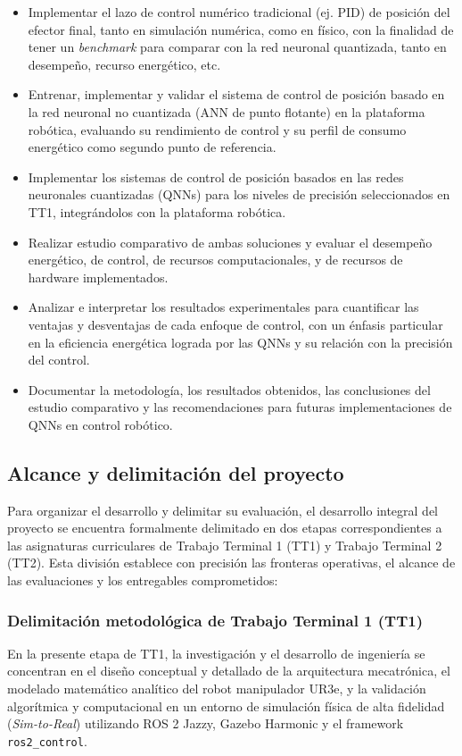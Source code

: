 \documentclass[12pt]{article}
\begin{document}
\begin{itemize}
    \item Implementar el lazo de control numérico tradicional (ej. PID) de posición del efector final, tanto en simulación numérica, como en físico, con la finalidad de tener un \textit{benchmark} para comparar con la red neuronal quantizada, tanto en desempeño, recurso energético, etc.
    \item Entrenar, implementar y validar el sistema de control de posición basado en la red neuronal no cuantizada (ANN de punto flotante) en la plataforma robótica, evaluando su rendimiento de control y su perfil de consumo energético como segundo punto de referencia.
    \item Implementar los sistemas de control de posición basados en las redes neuronales cuantizadas (QNNs) para los niveles de precisión seleccionados en TT1, integrándolos con la plataforma robótica.
    \item Realizar estudio comparativo de ambas soluciones y evaluar el desempeño energético, de control, de recursos computacionales, y de recursos de hardware implementados.
    \item Analizar e interpretar los resultados experimentales para cuantificar las ventajas y desventajas de cada enfoque de control, con un énfasis particular en la eficiencia energética lograda por las QNNs y su relación con la precisión del control.
    \item Documentar la metodología, los resultados obtenidos, las conclusiones del estudio comparativo y las recomendaciones para futuras implementaciones de QNNs en control robótico. 
\end{itemize}

\subsection*{Alcance y delimitación del proyecto}
Para organizar el desarrollo y delimitar su evaluación, el desarrollo integral del proyecto se encuentra formalmente delimitado en dos etapas correspondientes a las asignaturas curriculares de Trabajo Terminal 1 (TT1) y Trabajo Terminal 2 (TT2). Esta división establece con precisión las fronteras operativas, el alcance de las evaluaciones y los entregables comprometidos:

\subsubsection*{Delimitación metodológica de Trabajo Terminal 1 (TT1)}
En la presente etapa de TT1, la investigación y el desarrollo de ingeniería se concentran en el diseño conceptual y detallado de la arquitectura mecatrónica, el modelado matemático analítico del robot manipulador UR3e, y la validación algorítmica y computacional en un entorno de simulación física de alta fidelidad (\textit{Sim-to-Real}) utilizando ROS 2 Jazzy, Gazebo Harmonic y el framework \texttt{ros2\_control}.
\end{document}
